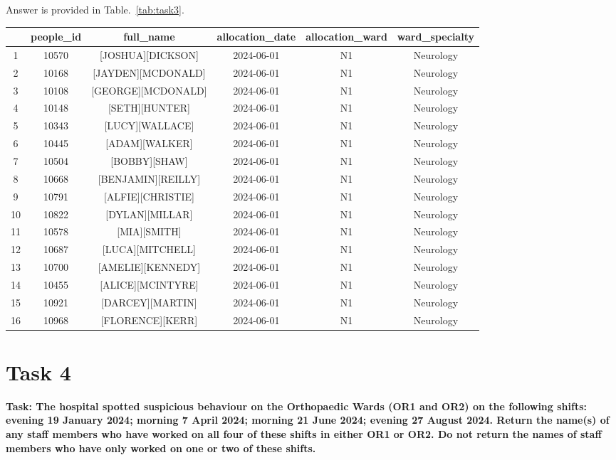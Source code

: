 \documentclass{article}
\begin{document}
Answer is provided in Table.~\ref{tab:task3}.

\begin{sidewaystable}[htbp]
\centering
\small
\begin{tabular}{|c|c|c|c|c|c|}
\hline & people\_id & full\_name & allocation\_date & allocation\_ward & ward\_specialty \\
\hline 1 & 10570 & [JOSHUA][DICKSON] & 2024-06-01 & N1 & Neurology \\
\hline 2 & 10168 & [JAYDEN][MCDONALD] & 2024-06-01 & N1 & Neurology \\
\hline 3 & 10108 & [GEORGE][MCDONALD] & 2024-06-01 & N1 & Neurology \\
\hline 4 & 10148 & [SETH][HUNTER] & 2024-06-01 & N1 & Neurology \\
\hline 5 & 10343 & [LUCY][WALLACE] & 2024-06-01 & N1 & Neurology \\
\hline 6 & 10445 & [ADAM][WALKER] & 2024-06-01 & N1 & Neurology \\
\hline 7 & 10504 & [BOBBY][SHAW] & 2024-06-01 & N1 & Neurology \\
\hline 8 & 10668 & [BENJAMIN][REILLY] & 2024-06-01 & N1 & Neurology \\
\hline 9 & 10791 & [ALFIE][CHRISTIE] & 2024-06-01 & N1 & Neurology \\
\hline 10 & 10822 & [DYLAN][MILLAR] & 2024-06-01 & N1 & Neurology \\
\hline 11 & 10578 & [MIA][SMITH] & 2024-06-01 & N1 & Neurology \\
\hline 12 & 10687 & [LUCA][MITCHELL] & 2024-06-01 & N1 & Neurology \\
\hline 13 & 10700 & [AMELIE][KENNEDY] & 2024-06-01 & N1 & Neurology \\
\hline 14 & 10455 & [ALICE][MCINTYRE] & 2024-06-01 & N1 & Neurology \\
\hline 15 & 10921 & [DARCEY][MARTIN] & 2024-06-01 & N1 & Neurology \\
\hline 16 & 10968 & [FLORENCE][KERR] & 2024-06-01 & N1 & Neurology \\
\hline
\end{tabular}
   \caption{List of staff who were working in the Neurology Ward on 2024-09-01}
    \label{tab:task3}
\end{sidewaystable}

\section{Task 4}
\textbf{Task: The hospital spotted suspicious behaviour on the Orthopaedic Wards (OR1 and OR2)
on the following shifts: evening 19 January 2024; morning 7 April 2024; morning 21
June 2024; evening 27 August 2024. Return the name(s) of any staff members who have
worked on all four of these shifts in either OR1 or OR2. Do not return the names of
staff members who have only worked on one or two of these shifts.}
\end{document}
